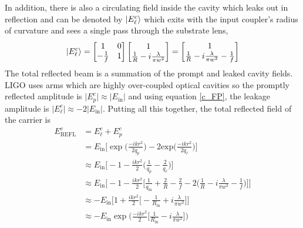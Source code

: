 		In addition, there is also a circulating field inside the cavity which leaks out in reflection and can be denoted by $\ket{E^c_{\ell}}$ which exits with the input coupler's radius of curvature and sees a single pass through the substrate lens,
		\begin{equation}\label{eq:leakE}
		\ket{E^c_{\ell}} = 		 
		\begin{bmatrix}
		1 	&	0 
		\\ 	-\frac{1}{f} 	&	1
		\end{bmatrix}
		\begin{bmatrix}
		1  
		\\ 	\frac{1}{R} - i\frac{\lambda}{\pi w^2}
		\end{bmatrix}
		=
		\begin{bmatrix}
		1  
		\\ 	\frac{1}{R} -i\frac{\lambda}{\pi w^2} - \frac{1}{f}
		\end{bmatrix}
		\end{equation}
		The total reflected beam is a summation of the prompt and leaked cavity fields.  LIGO uses arms which are highly over-coupled optical cavities so the promptly reflected amplitude is $\vert E^c_p \vert \approx \vert E_{\text{in}} \vert$ and using equation \ref{c_FP}, the leakage amplitude is $\vert E^c_\ell \vert \approx -2\vert E_{\text{in}} \vert$.  Putting all this together, the total reflected field of the carrier is
		\begin{equation}
		\begin{aligned}
		E^c_{\text{REFL}} 	&= E^c_{\ell} + E^c_p \\
							&= E_{\text{in}} \bigg[ \exp \bigg(\frac{-ik r^2}{2q_p}\bigg) - 2  \text{exp} \bigg(\frac{-ik r^2}{2q_{\ell}}\bigg) \bigg]\\
							&\approx E_{\text{in}} \bigg[ -1 - \frac{ikr^2}{2} \bigg( \frac{1}{q_p} - \frac{2}{q_\ell} \bigg) \bigg]\\
							&\approx E_{\text{in}} \bigg[ -1 - \frac{ikr^2}{2} \bigg[ \frac{1}{q_\text{in}} + \frac{2}{R} - \frac{2}{f}  - 2 \bigg(\frac{1}{R} - i\frac{\lambda}{\pi w^2} - \frac{1}{f} \bigg) \bigg] \bigg]\\
							&\approx -E_{\text{in}} \bigg[ 1 + \frac{ikr^2}{2} \bigg[ -\frac{1}{R_\text{in}} + i\frac{\lambda}{\pi w^2}  \bigg] \bigg]\\
							&\approx -E_{\text{in}} \exp\bigg(\frac{-ikr^2}{2} \bigg[ \frac{1}{R_{\text{in}}} - i\frac{\lambda}{\pi w^2}  \bigg]\bigg) 
		\end{aligned} 
		\end{equation}
